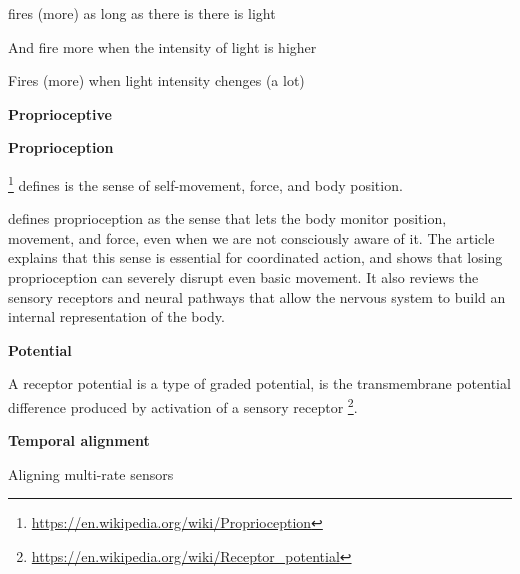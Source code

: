 \documentclass{book}
\providecommand{\ProjectDeepHeading}[2]{%
    \par\medskip\noindent\textbf{#2}\par\smallskip
}
\providecommand{\seeherefooter}[1]{\footnote{\url{#1}}}
\providecommand{\clickurlfooter}[1]{\footnote{\url{#1}}}
\begin{document}

fires (more) as long as there is there is light
    
    And fire more when the intensity of light is higher


Fires (more) when light intensity chenges (a lot)

\ProjectDeepHeading{6}{Proprioceptive}


\ProjectDeepHeading{9}{Proprioception}
        
        \clickurlfooter{https://en.wikipedia.org/wiki/Proprioception} defines is the sense of self-movement, force, and body position.
        
        \cite{tuthill-2018-proprioception} defines proprioception as the sense that lets the body monitor position, movement, and force, even when we are not consciously aware of it.
        The article explains that this sense is essential for coordinated action, and shows that losing proprioception can severely disrupt even basic movement.
        It also reviews the sensory receptors and neural pathways that allow the nervous system to build an internal representation of the body.

\ProjectDeepHeading{5}{Potential}


A receptor potential is a type of graded potential, is the transmembrane potential difference produced by activation of a sensory receptor \seeherefooter{https://en.wikipedia.org/wiki/Receptor_potential}.

\ProjectDeepHeading{5}{Temporal alignment}


Aligning multi-rate sensors
\end{document}
